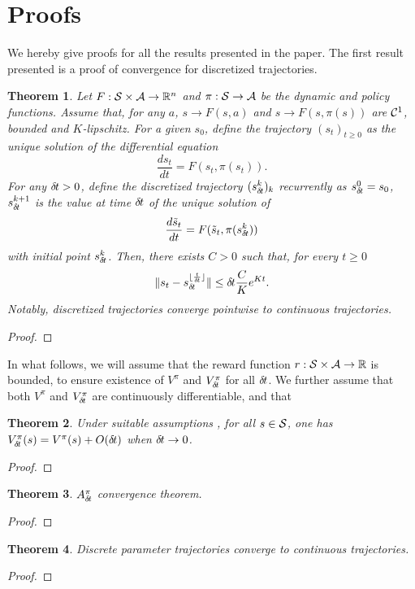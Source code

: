 \documentclass[11pt]{article}
\newtheorem{theorem}{Theorem}
\begin{document}
\section{Proofs}
We hereby give proofs for all the results presented in the paper.
The first result presented is a proof of convergence for discretized
trajectories.
\begin{theorem}
	Let $F: {\cal S} \times {\cal A} \rightarrow \mathbb{R}^n$ and $\pi: {\cal S}
	\rightarrow {\cal A}$ be the dynamic and policy functions. Assume that,
	for any $a$, $s \rightarrow F(s, a)$ and $s \rightarrow F(s, \pi(s))$
	are ${\cal C}^1$, bounded and $K$-lipschitz.  For
	a given $s_0$, define the trajectory $(s_t)_{t\geq 0}$ as the unique
	solution of the differential equation
	\begin{equation}
		\frac{ds_t}{dt} = F(s_t, \pi(s_t)).
		\label{eq:diff}
	\end{equation}
	For any ${\delta\hspace{-.1em}t} > 0$, define the discretized trajectory
	$(s_{\delta\hspace{-.1em}t}^k)_k$ recurrently as $s_{\delta\hspace{-.1em}t}^0 = s_0$,
	$s_{\delta\hspace{-.1em}t}^{k + 1}$ is the value at time ${\delta\hspace{-.1em}t}$ of
	the unique solution of
	\begin{equation}
		\frac{d\tilde{s}_t}{dt} = F(\tilde{s}_t, \pi(s_{\delta\hspace{-.1em}t}^k))
	\end{equation}
	with initial point $s_{\delta\hspace{-.1em}t}^k$.
	Then, there exists $C > 0$ such that, for every $t \geq 0$
	\begin{equation}
		\|s_t - s_{\delta\hspace{-.1em}t}^{\lfloor \frac{t}{{\delta\hspace{-.1em}t}} \rfloor}\|
		\leq {\delta\hspace{-.1em}t} \frac{C}{K}e^{Kt}.
	\end{equation}
	Notably, discretized trajectories converge pointwise to continuous trajectories.
	\label{th:traj-conv}
\end{theorem}
\begin{proof}
	
\end{proof}
In what follows, we will assume that the reward function $r: {\cal S} \times {\cal A} \rightarrow \mathbb{R}$
is bounded, to ensure existence of $V^\pi$ and $V^\pi_{\delta\hspace{-.1em}t}$ for all ${\delta\hspace{-.1em}t}$. We further assume that
both $V^\pi$ and $V^\pi_{\delta\hspace{-.1em}t}$ are continuously differentiable, and that 
\begin{theorem}
	Under suitable assumptions , for all $s \in {\cal
	S}$, one has
	$V^\pi_{\delta\hspace{-.1em}t}(s) = V^\pi(s) + O({\delta\hspace{-.1em}t})$
	when ${\delta\hspace{-.1em}t}\to 0$.
	\label{th:conv-value}
\end{theorem}
\begin{proof}
	
\end{proof}
\begin{theorem}
	$A^\pi_{\delta\hspace{-.1em}t}$ convergence theorem.
\end{theorem}
\begin{proof}
	
\end{proof}
\begin{theorem}
	Discrete parameter trajectories converge to continuous trajectories.
\end{theorem}
\begin{proof}
	
      \end{proof}
\end{document}
